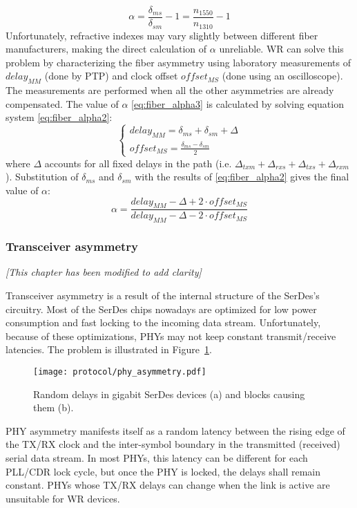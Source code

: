 \begin{equation}
\label{eq:fiber_alpha1}
\alpha = \frac{\delta_{ms}}{\delta_{sm}} - 1 = \frac{n_{1550}}{n_{1310}} - 1
\end{equation}
Unfortunately, refractive indexes may vary slightly between different fiber
manufacturers, making the direct calculation of $\alpha$ unreliable. WR
can solve this problem by characterizing the fiber asymmetry using
laboratory measurements of $delay_{MM}$ (done by PTP) and clock offset
$offset_{MS}$ (done using an oscilloscope). The measurements are performed
when all the other asymmetries are already compensated. The value of
$\alpha$ \ref{eq:fiber_alpha3} is calculated by solving equation system
\ref{eq:fiber_alpha2}:
\begin{equation}
\label{eq:fiber_alpha2}
\begin{cases}
delay_{MM} = \delta_{ms} + \delta_{sm} + \Delta \\
offset_{MS} = \frac{\delta_{ms} - \delta_{sm}}{2}
\end{cases}
\end{equation}
where $\Delta$ accounts for all fixed delays in the path (i.e. $\Delta_{txm}
+ \Delta_{rxs} + \Delta_{txs} + \Delta_{rxm}$). Substitution of $\delta_{ms}$
and $\delta_{sm}$ with the results of \ref{eq:fiber_alpha2} gives the final
value of $\alpha$:
\begin{equation}
\label{eq:fiber_alpha3}
\alpha = \frac{delay_{MM}  - \Delta + 2\cdot offset_{MS}}{delay_{MM} -
\Delta - 2\cdot offset_{MS}}
\end{equation}

\subsubsection{Transceiver asymmetry}
\label{s:xcvr_asymmetry}
\label{sec:calibForGigbitE}
\textit{[This chapter has been modified to add clarity]}


Transceiver asymmetry is a result of the internal structure of the SerDes's
circuitry. Most of the SerDes chips nowadays are optimized for low power
consumption and fast locking to the incoming data stream. Unfortunately,
because of these optimizations, PHYs may not keep constant transmit/receive
latencies. The problem is illustrated in Figure~\ref{fig:phy_asymmetry}.
\begin{figure}[ht!]
  \centering
  \texttt{[image: protocol/phy\_asymmetry.pdf]}
  \caption{Random delays in gigabit SerDes devices (a) and blocks causing them
  (b).}
  \label{fig:phy_asymmetry}
\end{figure}
PHY asymmetry manifests itself as a random latency between the rising edge of
the TX/RX clock and the inter-symbol boundary in the transmitted (received)
serial data stream. In most PHYs, this latency can be different for each
PLL/CDR lock cycle, but once the PHY is locked, the delays shall remain
constant. PHYs whose TX/RX delays can change when the link is active are
unsuitable for WR devices.

